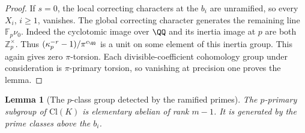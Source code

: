 \documentclass[a4paper,11pt]{article}
\newtheorem{lemma}[proposition]{Lemma}
\theoremstyle{definition}
\theoremstyle{remark}
\newcommand{\ZZ}{\mathbb Z}\newcommand{\ord}{\operatorname{ord}}
\numberwithin{equation}{section}
\begin{document}
\begin{proof}
If \(s=0\), the local correcting characters at the \(b_i\)
are unramified, so every \(X_i\), \(i\ge1\), vanishes. The
global correcting character generates the remaining line
\(\mathbb F_p\nu_0\). Indeed the cyclotomic image over \(\QQ\)
and its inertia image at \(p\) are both \(\ZZ_p^\times\).
Thus \((\kappa_p^{-r}-1)/\pi^{c_{\QQ}}\) is a unit on some
element of this inertia group. This again gives zero
\(\pi\)-torsion. Each divisible-coefficient cohomology group
under consideration is \(\pi\)-primary torsion, so vanishing
at precision one proves the lemma.
\end{proof}

\begin{lemma}[The \(p\)-class group detected by the ramified primes]
\leavevmode\label{lem:genuscyclic657}
The \(p\)-primary subgroup of \(\mathrm{Cl}(K)\) is elementary
abelian of rank \(m-1\). It is generated by the prime classes above
the \(b_i\).
\end{lemma}
\end{document}
